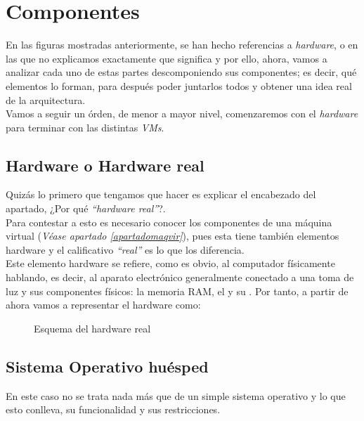 \section{Componentes}
En las figuras mostradas anteriormente, se han hecho referencias a \emph{hardware}, \emph{} o \emph{} en las que no explicamos exactamente que significa y por ello, ahora, vamos a analizar cada uno de estas partes descomponiendo sus componentes; es decir, qué elementos lo forman, para después poder juntarlos todos y obtener una idea real de la arquitectura.\\

Vamos a seguir un órden, de menor a mayor nivel, comenzaremos con el \emph{hardware} para terminar con las distintas \emph{VMs}.

\subsection{Hardware o Hardware real}
Quizás lo primero que tengamos que hacer es explicar el encabezado del apartado, ¿Por qué \emph{\textquotedblleft hardware real\textquotedblright}?.\\
Para contestar a esto es necesario conocer los componentes de una máquina virtual (\textit{Véase apartado \ref{apartadomaqvir}}), pues esta tiene también elementos hardware y el calificativo \emph{\textquotedblleft real\textquotedblright} es lo que los diferencia.\\

Este elemento hardware se refiere, como es obvio, al computador físicamente hablando, es decir, al aparato electrónico generalmente conectado a una toma de luz y sus componentes físicos: la memoria RAM, el   y su . Por tanto, a partir de ahora vamos a representar el hardware como:

\begin{figure}[H]
\begin{center}
\end{center}
\caption[Hardware Real]{Esquema del hardware real}
\end{figure}

\subsection{Sistema Operativo huésped}\label{sohost}
En este caso no se trata nada más que de un simple sistema operativo y lo que esto conlleva, su funcionalidad y sus restricciones.\\

